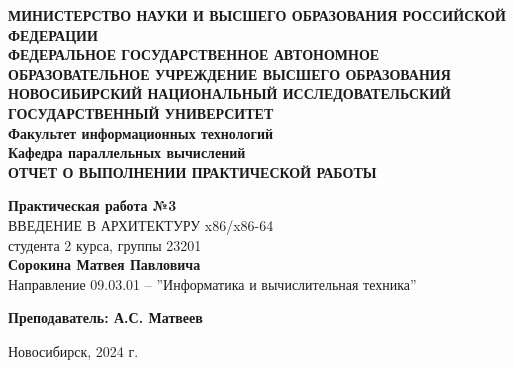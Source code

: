 \documentclass[12pt,a4paper]{article}
\numberwithin{subsection}{section}
\begin{document}
\begin{titlepage}
    \begin{center}
        \vspace*{2cm}
        {\Large \textbf{МИНИСТЕРСТВО НАУКИ И ВЫСШЕГО ОБРАЗОВАНИЯ РОССИЙСКОЙ ФЕДЕРАЦИИ}}\\
        \vspace{0.5cm}
        {\Large \textbf{ФЕДЕРАЛЬНОЕ ГОСУДАРСТВЕННОЕ АВТОНОМНОЕ ОБРАЗОВАТЕЛЬНОЕ УЧРЕЖДЕНИЕ ВЫСШЕГО ОБРАЗОВАНИЯ}}\\
        \vspace{0.5cm}
        {\Large \textbf{НОВОСИБИРСКИЙ НАЦИОНАЛЬНЫЙ ИССЛЕДОВАТЕЛЬСКИЙ ГОСУДАРСТВЕННЫЙ УНИВЕРСИТЕТ}}\\
        \vspace{0.5cm}
        {\large \textbf{Факультет информационных технологий}}\\
        \vspace{0.5cm}
        {\large \textbf{Кафедра параллельных вычислений}}\\
        \vspace{1cm}
         {\Large \textbf{ОТЧЕТ О ВЫПОЛНЕНИИ ПРАКТИЧЕСКОЙ РАБОТЫ}}
        \vspace{0.5cm}
        
        {\Large \textbf{Практическая работа №3}}\\
        \vspace{0.5cm}
         {\large ВВЕДЕНИЕ В АРХИТЕКТУРУ x86/x86-64}\\
        \vspace{0.5cm}
        {\large студента 2 курса, группы 23201}\\
        \vspace{0.5cm}
        {\Large \textbf{Сорокина Матвея Павловича}}\\
        \vspace{1cm}
        {\large Направление 09.03.01 -- ''Информатика и вычислительная техника''}\\
        \vspace{2cm}
        
        \begin{flushright}
            \textbf{Преподаватель: А.С. Матвеев} \\
        \end{flushright}
        
        \vfill
        
        {\large Новосибирск, 2024 г.}
    \end{center}
\end{titlepage}
\end{document}
